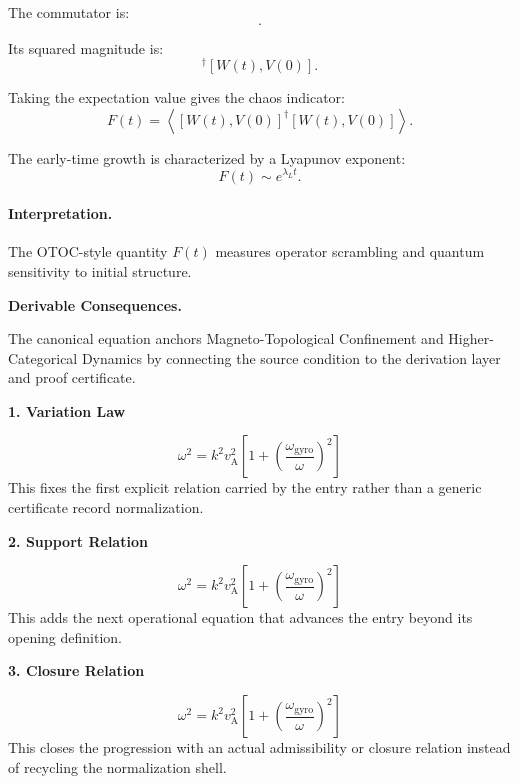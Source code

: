 The commutator is:
\begin{equation}
[W(t),V(0)] .
\end{equation}

Its squared magnitude is:
\begin{equation}
[W(t),V(0)]^\dagger[W(t),V(0)] .
\end{equation}

Taking the expectation value gives the chaos indicator:
\begin{equation}
\boxed{
F(t)
=
\left\langle
[W(t),V(0)]^\dagger
[W(t),V(0)]
\right\rangle .
}
\end{equation}

The early-time growth is characterized by a Lyapunov exponent:
\begin{equation}
F(t)\sim e^{\lambda_L t}.
\end{equation}

\paragraph{Interpretation.}
The OTOC-style quantity $F(t)$ measures operator scrambling and quantum sensitivity to initial structure.

\par\vspace{0.35em}
\noindent\textbf{Derivable Consequences.}\quad
\begingroup
\footnotesize
\raggedright
The canonical equation anchors Magneto-Topological Confinement and Higher-Categorical Dynamics by connecting the source condition to the derivation layer and proof certificate.
\par\endgroup

\noindent\textbf{1. Variation Law}\par
\[
\omega^{2} = k^{2} v_{\mathrm{A}}^{2}\left[1 + \left(\frac{\omega_{\mathrm{gyro}}}{\omega}\right)^{2}\right]
\]
\noindent This fixes the first explicit relation carried by the entry rather than a generic certificate record normalization.\par
\noindent\textbf{2. Support Relation}\par
\[
\omega^{2} = k^{2} v_{\mathrm{A}}^{2}\left[1 + \left(\frac{\omega_{\mathrm{gyro}}}{\omega}\right)^{2}\right]
\]
\noindent This adds the next operational equation that advances the entry beyond its opening definition.\par
\noindent\textbf{3. Closure Relation}\par
\[
\omega^{2} = k^{2} v_{\mathrm{A}}^{2}\left[1 + \left(\frac{\omega_{\mathrm{gyro}}}{\omega}\right)^{2}\right]
\]
\noindent This closes the progression with an actual admissibility or closure relation instead of recycling the normalization shell.\par

